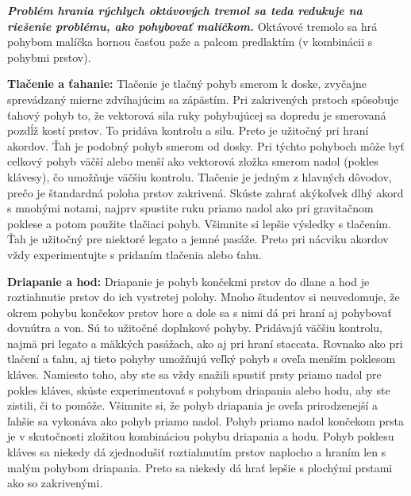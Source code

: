 \documentclass[11pt,a4paper%
]{book}
\begin{document}
\emph{\textbf{Problém hrania rýchlych oktávových tremol sa teda redukuje na riešenie problému, ako pohybovať malíčkom.}} Oktávové tremolo sa hrá pohybom malíčka hornou časťou paže a palcom predlaktím (v kombinácii s pohybmi prstov).

\textbf{Tlačenie a ťahanie:} Tlačenie je tlačný pohyb smerom k doske, zvyčajne sprevádzaný mierne zdvíhajúcim sa zápästím. Pri zakrivených prstoch spôsobuje ťahový pohyb to, že vektorová sila ruky pohybujúcej sa dopredu je smerovaná pozdĺž kostí prstov. To pridáva kontrolu a silu. Preto je užitočný pri hraní akordov. Ťah je podobný pohyb smerom od dosky. Pri týchto pohyboch môže byť celkový pohyb väčší alebo menší ako vektorová zložka smerom nadol (pokles klávesy), čo umožňuje väčšiu kontrolu. Tlačenie je jedným z hlavných dôvodov, prečo je štandardná poloha prstov zakrivená. Skúste zahrať akýkoľvek dlhý akord s mnohými notami, najprv spustite ruku priamo nadol ako pri gravitačnom poklese a potom použite tlačiaci pohyb. Všimnite si lepšie výsledky s tlačením. Ťah je užitočný pre niektoré legato a jemné pasáže. Preto pri nácviku akordov vždy experimentujte s pridaním tlačenia alebo ťahu.

\textbf{Driapanie a hod:} Driapanie je pohyb končekmi prstov do dlane a hod je roztiahnutie prstov do ich vystretej polohy. Mnoho študentov si neuvedomuje, že okrem pohybu končekov prstov hore a dole sa s nimi dá pri hraní aj pohybovať dovnútra a von. Sú to užitočné doplnkové pohyby. Pridávajú väčšiu kontrolu, najmä pri legato a mäkkých pasážach, ako aj pri hraní staccata. Rovnako ako pri tlačení a ťahu, aj tieto pohyby umožňujú veľký pohyb s oveľa menším poklesom kláves. Namiesto toho, aby ste sa vždy snažili spustiť prsty priamo nadol pre pokles kláves, skúste experimentovať s pohybom driapania alebo hodu, aby ste zistili, či to pomôže. Všimnite si, že pohyb driapania je oveľa prirodzenejší a ľahšie sa vykonáva ako pohyb priamo nadol. Pohyb priamo nadol končekom prsta je v skutočnosti zložitou kombináciou pohybu driapania a hodu. Pohyb poklesu kláves sa niekedy dá zjednodušiť roztiahnutím prstov naplocho a hraním len s malým pohybom driapania. Preto sa niekedy dá hrať lepšie s plochými prstami ako so zakrivenými.
\end{document}
